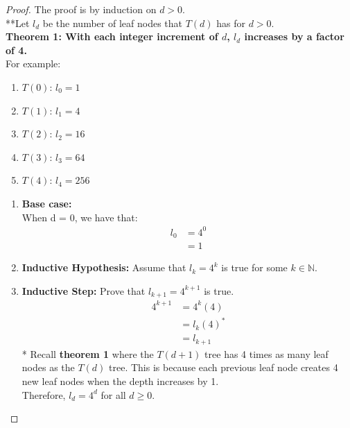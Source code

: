 \documentclass[11pt]{article}
\theoremstyle{definition}
\theoremstyle{definition}
\theoremstyle{definition}
\begin{document}
\begin{proof}
The proof is by induction on $d > 0$. \\
**Let $l_d$ be the number of leaf nodes that $T(d)$ has for $d > 0$. \\
\textbf{Theorem 1: With each integer increment of $d$, $l_d$ increases by a factor of 4. } \\
For example: 
\begin{enumerate}
    \item $T(0)$: $l_0 = 1$
    \item $T(1)$: $l_1 = 4$
    \item $T(2)$: $l_2 = 16$
    \item $T(3)$: $l_3 = 64$
    \item $T(4)$: $l_4 = 256$
\end{enumerate}

\begin{enumerate}
    \item \textbf{Base case:} \\
    When d = 0, we have that:
    \begin{align*}
        l_0 &= 4^0 \\
        &= 1
    \end{align*}
    
    \item \textbf{Inductive Hypothesis:} 
    Assume that $l_k = 4^k$ is true for some $k \in \mathbb{N}$. 
    
    \item \textbf{Inductive Step:} 
    Prove that $l_{k+1} = 4^{k+1}$ is true.
    \begin{align*}
        4^{k+1} &= 4^k(4) \\
                &= l_k(4) ^{*} \\
                &= l_{k+1}
    \end{align*}
    * Recall \textbf{theorem 1} where the $T(d+1)$ tree has 4 times as many leaf nodes as the $T(d)$ tree. This is because each previous leaf node creates 4 new leaf nodes when the depth increases by 1. \\ Therefore, $l_d = 4^d$ for all $d \geq 0$.
\end{enumerate}
\end{proof}
\end{document}
